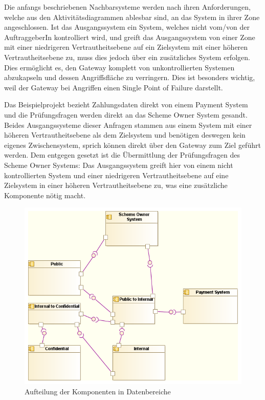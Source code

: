 Die anfangs beschriebenen Nachbarsysteme werden nach ihren Anforderungen, welche aus den Aktivitätsdiagrammen ablesbar sind, an das System in ihrer Zone angeschlossen. Ist das Ausgangssystem ein System, welches nicht vom/von der AuftraggeberIn kontrolliert wird, und greift das Ausgangssystem von einer Zone mit einer niedrigeren Vertrautheitsebene auf ein Zielsystem mit einer höheren Vertrautheitsebene zu, muss dies jedoch über ein zusätzliches System erfolgen. Dies ermöglicht es, den Gateway komplett von unkontrollierten Systemen abzukapseln und dessen Angriffsfläche zu verringern. Dies ist besonders wichtig, weil der Gateway bei Angriffen einen Single Point of Failure darstellt.

Das Beispielprojekt bezieht Zahlungsdaten direkt von einem Payment System und die Prüfungsfragen werden direkt an das Scheme Owner System gesandt. Beides Ausgangssysteme dieser Anfragen stammen aus einem System mit einer höheren Vertrautheitsebene als dem Zielsystem und benötigen deswegen kein eigenes Zwischensystem, sprich können direkt über den Gateway zum Ziel geführt werden. Dem entgegen gesetzt ist die Übermittlung der Prüfungsfragen des Scheme Owner Systems: Das Ausgangssystem greift hier von einem nicht kontrollierten System und einer niedrigeren Vertrautheitsebene auf eine Zielsystem in einer höheren Vertrautheitsebene zu, was eine zusätzliche Komponente nötig macht.

\begin{figure}[H]
    \centering
    \includegraphics[scale=0.7]{uml/dataarch.png}
    \caption{Aufteilung der Komponenten in Datenbereiche}
\end{figure}

